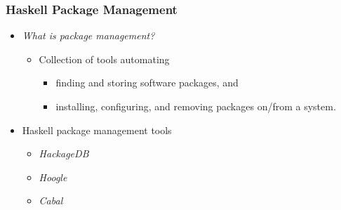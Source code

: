 \begin{frame}
  \frametitle{Haskell Package Management}
  \begin{itemize}
    \item \emph{What is package management?}
      \begin{itemize}
        \item Collection of tools automating
          \begin{itemize}
            \item finding and storing software packages, and
            \item installing, configuring, and removing packages on/from a system.
          \end{itemize} 
      \end{itemize}    
    \item Haskell package management tools
      \begin{itemize}
        \item \emph{HackageDB}
        \item \emph{Hoogle}
        \item \emph{Cabal}
      \end{itemize}         
  \end{itemize}
\end{frame}